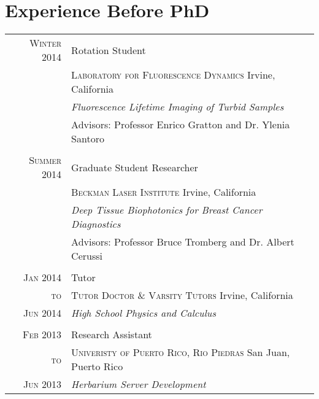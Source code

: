 \documentclass[letterpaper,10pt]{article} %
\begin{document}

\section{Experience Before PhD}

\begin{tabular}{r|p{11cm}}

\textsc{Winter 2014} & Rotation Student \\
& \textsc{Laboratory for Fluorescence Dynamics} Irvine, California\\
&\emph{Fluorescence Lifetime Imaging of Turbid Samples}\\
& Advisors: Professor Enrico Gratton and Dr. Ylenia Santoro \\

\multicolumn{2}{c}{} \\


\textsc{Summer 2014} & Graduate Student Researcher \\
& \textsc{Beckman Laser Institute} Irvine, California\\
&\emph{Deep Tissue Biophotonics for Breast Cancer Diagnostics}\\ 
& Advisors: Professor Bruce Tromberg and Dr. Albert Cerussi \\

\multicolumn{2}{c}{} \\


\textsc{Jan 2014} & Tutor \\
\textsc{to} & \textsc{Tutor Doctor \& Varsity Tutors} Irvine, California\\
\textsc{Jun 2014} &\emph{High School Physics and Calculus}\\ 

\multicolumn{2}{c}{} \\


\textsc{Feb 2013} & Research Assistant  \\
\textsc{to} & \textsc{Univeristy of Puerto Rico, Rio Piedras} San Juan, Puerto Rico\\
\textsc{Jun 2013} & \emph{Herbarium Server Development}\\ 


\end{tabular}
\end{document}
